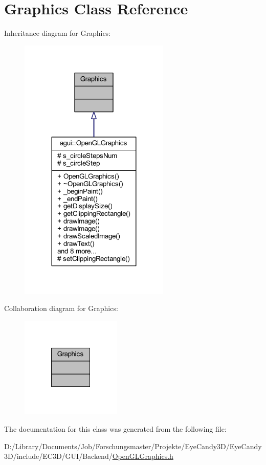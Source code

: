 \hypertarget{class_graphics}{}\section{Graphics Class Reference}
\label{class_graphics}


Inheritance diagram for Graphics\+:
\nopagebreak
\begin{figure}[H]
\begin{center}
\leavevmode
\includegraphics[width=203pt]{class_graphics__inherit__graph}
\end{center}
\end{figure}


Collaboration diagram for Graphics\+:
\nopagebreak
\begin{figure}[H]
\begin{center}
\leavevmode
\includegraphics[width=136pt]{class_graphics__coll__graph}
\end{center}
\end{figure}


The documentation for this class was generated from the following file\+:\begin{DoxyCompactItemize}
\item 
D\+:/\+Library/\+Documents/\+Job/\+Forschungsmaster/\+Projekte/\+Eye\+Candy3\+D/\+Eye\+Candy3\+D/include/\+E\+C3\+D/\+G\+U\+I/\+Backend/\mbox{\hyperlink{_open_g_l_graphics_8h}{Open\+G\+L\+Graphics.\+h}}\end{DoxyCompactItemize}
